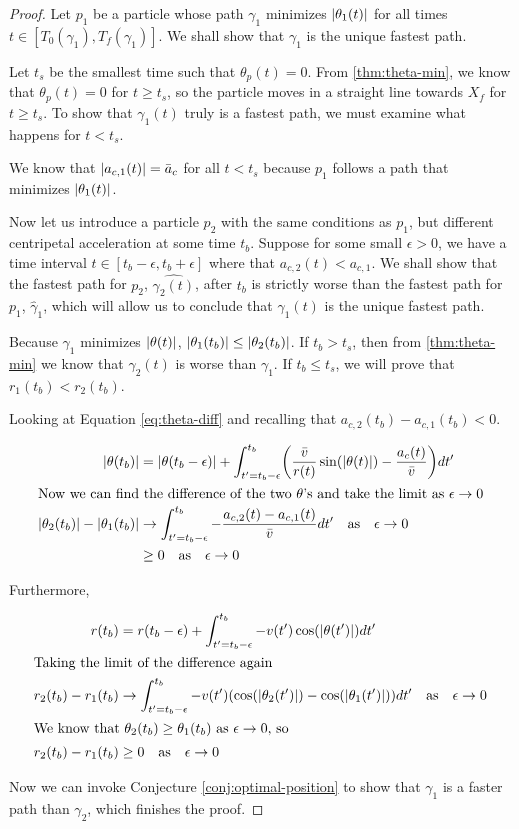 \begin{proof}
Let $p_1$ be a particle whose path $\gamma_1$ minimizes $\abs{\theta_1(t)}$ for all times $t \in [T_0(\gamma_1), T_f(\gamma_1)]$. We shall show that $\gamma_1$ is the unique fastest path.

Let $t_s$ be the smallest time such that $\theta_p(t) = 0$. From \ref{thm:theta-min}, we know that $\theta_p(t) = 0$ for $t \ge t_s$, so the particle moves in a straight line towards $X_f$ for $t \ge t_s$. To show that $\gamma_1(t)$ truly is a fastest path, we must examine what happens for $t < t_s$.

We know that $\abs{a_{c,1}(t)} = \bar{a}_c$ for all $t < t_s$ because $p_1$ follows a path that minimizes $\abs{\theta_1(t)}$.

Now let us introduce a particle $p_2$ with the same conditions as $p_1$, but different centripetal acceleration at some time $t_b$. Suppose for some small $\epsilon > 0$, we have a time interval $t \in [t_b-\epsilon, t_b+\epsilon]$ where that $a_{c,2}(t) < a_{c,1}$.  We shall show that the fastest path for $p_2$, $\hat{\gamma_2(t)}$, after $t_b$ is strictly worse than the fastest path for $p_1$, $\hat{\gamma}_1$, which will allow us to conclude that $\gamma_1(t)$ is the unique fastest path.

Because $\gamma_1$ minimizes $\abs{\theta(t)}$, $\abs{\theta_1(t_b)} \le \abs{\theta_2(t_b)}$. If $t_b > t_s$, then from \ref{thm:theta-min} we know that $\gamma_2(t)$ is worse than $\gamma_1$. If $t_b \le t_s$, we will prove that $r_1(t_b) < r_2(t_b)$. 

Looking at Equation \ref{eq:theta-diff} and recalling that $a_{c,2}(t_b) - a_{c,1}(t_b) < 0$.

\begin{align*}
  \abs{\theta(t_b)}& = \abs{\theta(t_b - \epsilon)} + \int_{t' = t_b-\epsilon}^{t_b} \paren{\frac{\bar{v}}{r(t)} \sin(\abs{\theta(t)}) - \frac{a_c(t)}{\bar{v}}} dt'\\
  \intertext{Now we can find the difference of the two $\theta$'s and take the limit as $\epsilon \to 0$}
  \abs{\theta_2(t_b)} - \abs{\theta_1(t_b)}& \to \int_{t' = t_b-\epsilon}^{t_b} - \frac{a_{c,2}(t) - a_{c,1}(t)}{\bar{v}} dt' \quad \text{as} \quad \epsilon \to 0\\
  & \ge 0 \quad \text{as} \quad \epsilon \to 0
\end{align*}

Furthermore, 

\begin{align}
  r(t_b)& = r(t_b - \epsilon) + \int_{t' = t_b - \epsilon}^{t_b} - v(t') \cos(\abs{\theta(t')}) dt'\\
  \intertext{Taking the limit of the difference again}
  r_2(t_b) - r_1(t_b)& \to \int_{t' = t_b - \epsilon}^{t_b} - v(t') \paren{\cos(\abs{\theta_2(t')}) - \cos(\abs{\theta_1(t')})} dt' \quad \text{as} \quad \epsilon \to 0\\
  \intertext{We know that $\theta_2(t_b) \ge \theta_1(t_b)$ as $\epsilon \to 0$, so}
  r_2(t_b) - r_1(t_b)& \ge 0 \quad \text{as} \quad \epsilon \to 0
\end{align}

Now we can invoke Conjecture \ref{conj:optimal-position} to show that $\gamma_1$ is a faster path than $\gamma_2$, which finishes the proof.
\end{proof}
